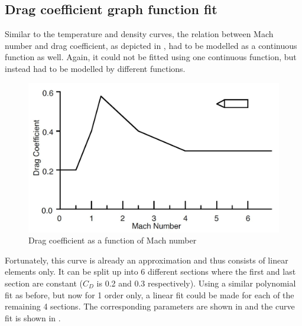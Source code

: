 
\subsection{Drag coefficient graph function fit}
\label{subsec:dragCoefFuncFit}
Similar to the temperature and density curves, the relation between Mach number and drag coefficient, as depicted in , had to be modelled as a continuous function as well. Again, it could not be fitted using one continuous function, but instead had to be modelled by different functions.

\begin{figure}[!ht]
\centering
\includegraphics[width=1.0\textwidth]{figures/launcher_methods/dragcoeff_whitehead2004mars.jpg}
\caption{Drag coefficient as a function of Mach number \cite{whitehead2004mars}}
\label{fig:dragcoeff_whitehead2004mars}
\end{figure}

Fortunately, this curve is already an approximation and thus consists of linear elements only. It can be split up into 6 different sections where the first and last section are constant ($C_{D}$ is 0.2 and 0.3 respectively). Using a similar polynomial fit as before, but now for 1 order only, a linear fit could be made for each of the remaining 4 sections. The corresponding parameters are shown in  and the curve fit is shown in .


